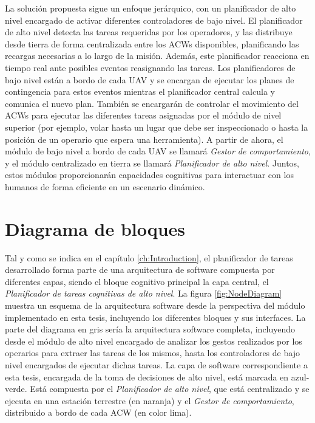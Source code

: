 \documentclass[fontsize=11pt, English=false, Español=true, Myfinal=true, twoside, numbers=noenddot]{scrbook}
\begin{document}
La solución propuesta sigue un enfoque jerárquico, con un planificador de alto nivel encargado de activar diferentes controladores de bajo nivel. El planificador de alto nivel detecta las tareas requeridas por los operadores, y las distribuye desde tierra de forma centralizada entre los \glspl{ACW} disponibles, planificando las recargas necesarias a lo largo de la misión. Además, este planificador reacciona en tiempo real ante posibles eventos reasignando las tareas. Los planificadores de bajo nivel están a bordo de cada \gls{UAV} y se encargan de ejecutar los planes de contingencia para estos eventos mientras el planificador central calcula y comunica el nuevo plan. También se encargarán de controlar el movimiento del \glspl{ACW} para ejecutar las diferentes tareas asignadas por el módulo de nivel superior (por ejemplo, volar hasta un lugar que debe ser inspeccionado o hasta la posición de un operario que espera una herramienta). A partir de ahora, el módulo de bajo nivel a bordo de cada \gls{UAV} se llamará \emph{Gestor de comportamiento}, y el módulo centralizado en tierra se llamará \emph{Planificador de alto nivel}. Juntos, estos módulos proporcionarán capacidades cognitivas para interactuar con los humanos de forma eficiente en un escenario dinámico. 

\section{Diagrama de bloques}
\label{sec:NodeDiagram}
Tal y como se indica en el capítulo \ref{ch:Introduction}, el planificador de tareas desarrollado forma parte de una arquitectura de software compuesta por diferentes capas, siendo el bloque cognitivo principal la capa central, el \emph{Planificador de tareas cognitivas de alto nivel}. La figura \ref{fig:NodeDiagram} muestra un esquema de la arquitectura software desde la perspectiva del módulo implementado en esta tesis, incluyendo los diferentes bloques y sus interfaces. La parte del diagrama en gris sería la arquitectura software completa, incluyendo desde el módulo de alto nivel encargado de analizar los gestos realizados por los operarios para extraer las tareas de los mismos, hasta los controladores de bajo nivel encargados de ejecutar dichas tareas. La capa de software correspondiente a esta tesis, encargada de la toma de decisiones de alto nivel, está marcada en azul-verde. Está compuesta por el \emph{Planificador de alto nivel}, que está centralizado y se ejecuta en una estación terrestre (en naranja) y el \emph{Gestor de comportamiento}, distribuido a bordo de cada \gls{ACW} (en color lima).
\end{document}

